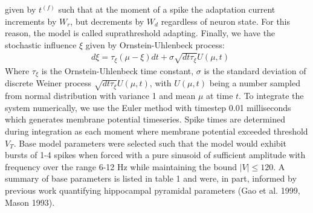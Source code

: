 \documentclass[12pt, letterpaper]{article}
\newenvironment{collapsable}{}{}
\begin{document}
\begin{collapsable}
  given by $t^{(f)}$ such that at the moment of a spike the adaptation current
  increments by $W_r$, but decrements by $W_d$ regardless of neuron state. For
  this reason, the model is called suprathreshold adapting. Finally, we have the
  stochastic influence $\xi$ given by Ornstein-Uhlenbeck process:
  \begin{align*}
    &d\xi=\tau_{\xi}(\mu-\xi)dt+\sigma\sqrt{dt\tau_{\xi}}U(\mu, t)\tag{7}
  \end{align*}
  Where $\tau_{\xi}$ is the Ornstein-Uhlenbeck time constant, $\sigma$ is the
  standard deviation of discrete Weiner process $\sqrt{dt\tau_{\xi}}U(\mu,t)$,
  with $U(\mu,t)$ being a number sampled from normal distribution with variance 1
  and mean $\mu$ at time $t$. To integrate the system numerically, we use the
  Euler method with timestep 0.01 milliseconds which generates membrane potential
  timeseries. Spike times are determined during integration as each moment where
  membrane potential exceeded threshold $V_T$. Base model parameters were
  selected such that the model would exhibit bursts of 1-4 spikes when forced with
  a pure sinusoid of sufficient amplitude with frequency over the range 6-12 Hz
  while maintaining the bound $|V|\leq 120$. A summary of base parameters is
  listed in table 1 and were, in part, informed by previous work quantifying
  hippocampal pyramidal parameters (Gao et al. 1999, Mason 1993).

  \vspace{12pt}


\end{collapsable}
\end{document}
